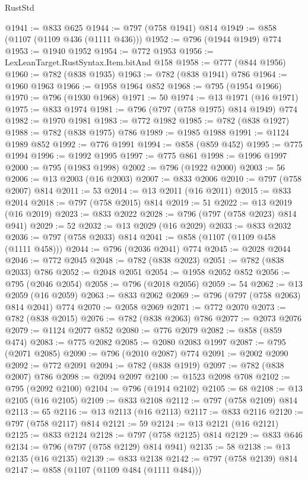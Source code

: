 \begin{lexlean}{RustStd}
\begin{coremodule}
@1941 := @833 @625
@1944 := @797 (@758 @1941) @814
@1949 := @858 (@1107 (@1109 @436 (@1111 @436)))
@1952 := @796 (@1944 @1949) @774
@1953 := @1940 @1952
@1954 := @772 @1953
@1956 := LexLeanTarget.RustSyntax.Item.bitAnd @158
@1958 := @777 (@844 @1956)
@1960 := @782 (@838 @1935)
@1963 := @782 (@838 @1941) @786
@1964 := @1960 @1963
@1966 := @1958 @1964 @852
@1968 := @795 (@1954 @1966)
@1970 := @796 (@1930 @1968)
@1971 := 50
@1974 := @13 @1971 (@16 @1971)
@1975 := @833 @1974
@1981 := @796 (@797 (@758 @1975) @814 @1949) @774
@1982 := @1970 @1981
@1983 := @772 @1982
@1985 := @782 (@838 @1927)
@1988 := @782 (@838 @1975) @786
@1989 := @1985 @1988
@1991 := @1124 @1989 @852
@1992 := @776 @1991
@1994 := @858 (@859 @452)
@1995 := @775 @1994
@1996 := @1992 @1995
@1997 := @775 @861
@1998 := @1996 @1997
@2000 := @795 (@1983 @1998)
@2002 := @796 (@1922 @2000)
@2003 := 56
@2006 := @13 @2003 (@16 @2003)
@2007 := @833 @2006
@2010 := @797 (@758 @2007) @814
@2011 := 53
@2014 := @13 @2011 (@16 @2011)
@2015 := @833 @2014
@2018 := @797 (@758 @2015) @814
@2019 := 51
@2022 := @13 @2019 (@16 @2019)
@2023 := @833 @2022
@2028 := @796 (@797 (@758 @2023) @814 @941)
@2029 := 52
@2032 := @13 @2029 (@16 @2029)
@2033 := @833 @2032
@2036 := @797 (@758 @2033) @814
@2041 := @858 (@1107 (@1109 @458 (@1111 @458)))
@2044 := @796 (@2036 @2041) @774
@2045 := @2028 @2044
@2046 := @772 @2045
@2048 := @782 (@838 @2023)
@2051 := @782 (@838 @2033) @786
@2052 := @2048 @2051
@2054 := @1958 @2052 @852
@2056 := @795 (@2046 @2054)
@2058 := @796 (@2018 @2056)
@2059 := 54
@2062 := @13 @2059 (@16 @2059)
@2063 := @833 @2062
@2069 := @796 (@797 (@758 @2063) @814 @2041) @774
@2070 := @2058 @2069
@2071 := @772 @2070
@2073 := @782 (@838 @2015)
@2076 := @782 (@838 @2063) @786
@2077 := @2073 @2076
@2079 := @1124 @2077 @852
@2080 := @776 @2079
@2082 := @858 (@859 @474)
@2083 := @775 @2082
@2085 := @2080 @2083 @1997
@2087 := @795 (@2071 @2085)
@2090 := @796 (@2010 @2087) @774
@2091 := @2002 @2090
@2092 := @772 @2091
@2094 := @782 (@838 @1919)
@2097 := @782 (@838 @2007) @786
@2098 := @2094 @2097
@2100 := @1523 @2098 @708
@2102 := @795 (@2092 @2100)
@2104 := @796 (@1914 @2102)
@2105 := 68
@2108 := @13 @2105 (@16 @2105)
@2109 := @833 @2108
@2112 := @797 (@758 @2109) @814
@2113 := 65
@2116 := @13 @2113 (@16 @2113)
@2117 := @833 @2116
@2120 := @797 (@758 @2117) @814
@2121 := 59
@2124 := @13 @2121 (@16 @2121)
@2125 := @833 @2124
@2128 := @797 (@758 @2125) @814
@2129 := @833 @646
@2134 := @796 (@797 (@758 @2129) @814 @941)
@2135 := 58
@2138 := @13 @2135 (@16 @2135)
@2139 := @833 @2138
@2142 := @797 (@758 @2139) @814
@2147 := @858 (@1107 (@1109 @484 (@1111 @484)))

\end{coremodule}
\end{lexlean}
